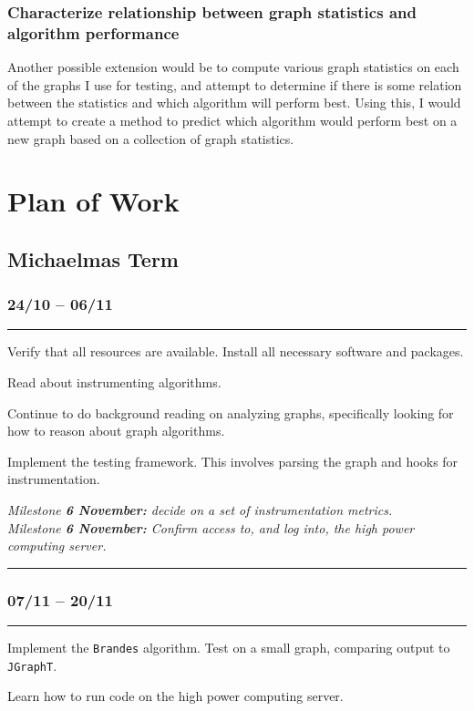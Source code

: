 \documentclass[a4paper,12pt]{article}
\begin{document}
\subsubsection*{Characterize relationship between graph statistics and algorithm performance}
Another possible extension would be to compute various graph statistics on each of the graphs I use for testing, and attempt to determine if there is some relation between the statistics and which algorithm will perform best. Using this, I would attempt to create a method to predict which algorithm would perform best on a new graph based on a collection of graph statistics.

\section{Plan of Work}
\label{plan}

\subsection*{Michaelmas Term}

 
\subsubsection*{24/10 -- 06/11}\hrule
Verify that all resources are available. Install all necessary software and packages. 

\noindent
Read about instrumenting algorithms.

\noindent
Continue to do background reading on analyzing graphs, specifically looking for how to reason about graph algorithms.

\noindent
Implement the testing framework. This involves parsing the graph and hooks for instrumentation. 

\noindent
\textit{Milestone \textbf{6 November:} decide on a set of instrumentation metrics.}\\
\textit{Milestone \textbf{6 November:} Confirm access to, and log into, the high power computing server.}\\
\hrule

\subsubsection*{07/11 -- 20/11}\hrule

\noindent
Implement the \verb|Brandes| algorithm. Test on a small graph, comparing output to \verb|JGraphT|.

\noindent
Learn how to run code on the high power computing server.
\end{document}
